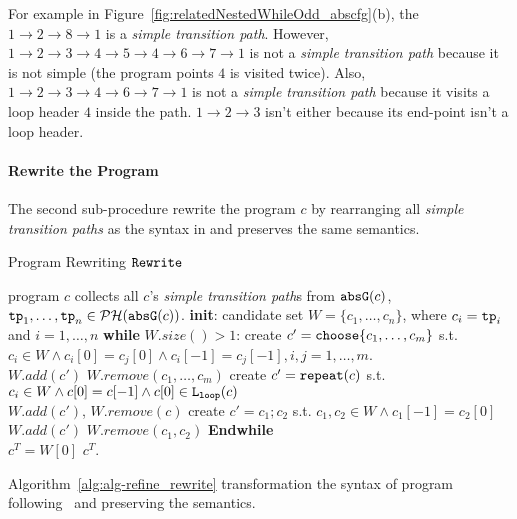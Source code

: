 For example in Figure~\ref{fig:relatedNestedWhileOdd_abscfg}(b), the $1 \to 2 \to 8 \to 1$ is a \emph{simple transition path}.
However, $1 \to 2 \to 3 \to 4 \to 5 \to 4 \to 6 \to 7 \to 1$ is not a \emph{simple transition path} because it is not simple (the program points $4$ is visited twice).
Also, $1 \to 2 \to 3 \to 4 \to 6 \to 7 \to 1$ is not a \emph{simple transition path} because it visits a loop header $4$ inside the path. $1 \to 2 \to 3$ isn't either because its end-point isn't a loop header.


\paragraph{Rewrite the Program}
The second sub-procedure rewrite the program $c$ by rearranging all \emph{simple transition paths} as the syntax in \cite{GulwaniJK09} and preserves the same semantics.
\begin{algorithm}
  \caption{Program Rewriting $\mathtt{Rewrite}$}
  \label{alg:alg-refine_rewrite}
  \begin{algorithmic}[1]
    \REQUIRE program $c$
    \STATE collects all $c$'s \emph{simple transition path}s from $\mathtt{abs}{\mathtt{G}}(c)$, $\mathtt{tp}_1, \ldots, \mathtt{tp}_n \in \mathcal{PH}(\mathtt{abs}{\mathtt{G}}(c))$.
    \STATE \textbf{init}: candidate set $W = \{c_1, \ldots, c_n\}$, where $c_i = \mathtt{tp}_i$ and $i = 1, \ldots, n$
    \STATE \textbf{while} $W.size()> 1$:
    \STATE \quad create $c' = \rpchoose{c_1, \ldots, c_m}$ 
    s.t. $c_i \in W \land c_i[0] = c_j[0] \land c_i[-1] = c_j[-1], i, j = 1, \ldots, m$.
    \\ \quad $W.add(c')$ \qquad $W.remove(c_1, \ldots, c_m)$
    \STATE
    \quad create $c' = \mathtt{repeat}(c)$ s.t. $c_i \in W \land c[0] = c[-1] \land c[0] \in \mathtt{L}_{\mathtt{loop}}(c)$
    \\ \quad $W.add(c')$, \qquad $W.remove(c)$
    \STATE \quad create $c' = c_1; c_2$ s.t. $c_1, c_2 \in W \land c_1[-1] = c_2[0]$
    \\
    \quad $W.add(c')$ \qquad $W.remove(c_1, c_2)$
    \STATE \textbf{Endwhile}
    \\ $c^T = W[0]$
    \RETURN $c^T$.
\end{algorithmic}
\end{algorithm}
%
Algorithm~\ref{alg:alg-refine_rewrite} transformation the syntax of program following~\cite{GulwaniJK09} and preserving the semantics.
